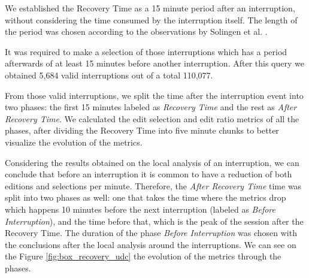 \documentclass[times]{smrauth}
\begin{document}
We established the Recovery Time as a 15 minute period after an interruption, without considering the time consumed by the interruption itself. The length of the period was chosen according to the observations by Solingen et al. \cite{SBV98}.

It was required to make a selection of those interruptions which has a period afterwards of at least 15 minutes before another interruption. After this query we obtained 5,684 valid interruptions out of a total 110,077.

From those valid interruptions, we split the time after the interruption event into two phases: the first 15 minutes labeled as \textit{Recovery Time} and the rest as \textit{After Recovery Time}. We calculated the edit selection and edit ratio metrics of all the phases, after dividing the Recovery Time into five minute chunks to better visualize the evolution of the metrics.

Considering the results obtained on the local analysis of an interruption, we can conclude that before an interruption it is common to have a reduction of both editions and selections per minute. Therefore, the \textit{After Recovery Time} time was split into two phases as well: one that takes the time where the metrics drop which happens 10 minutes before the next interruption (labeled as  \textit{Before Interruption}), and the time before that, which is the peak of the session after the Recovery Time. The duration of the phase \textit{Before Interruption} was chosen with the conclusions after the local analysis around the interruptions.  We can see on the Figure \ref{fig:box_recovery_udc} the evolution of the metrics through the phases.
\end{document}
